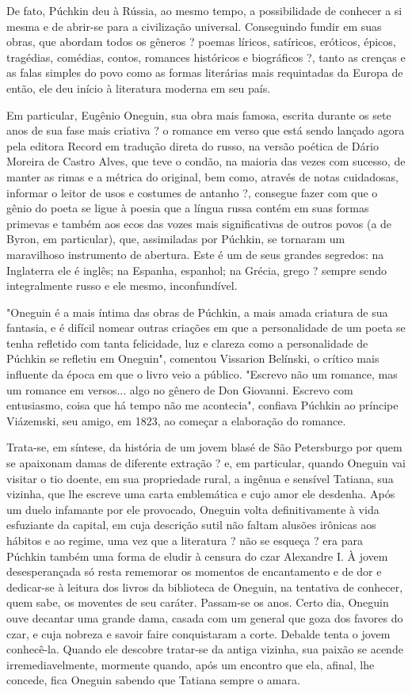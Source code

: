 De fato, Púchkin deu à Rússia, ao mesmo tempo, a possibilidade de
conhecer a si mesma e de abrir-se para a civilização universal.
Conseguindo fundir em suas obras, que abordam todos os gêneros ? poemas
líricos, satíricos, eróticos, épicos, tragédias, comédias, contos,
romances históricos e biográficos ?, tanto as crenças e as falas simples
do povo como as formas literárias mais requintadas da Europa de então,
ele deu início à literatura moderna em seu país.

Em particular, Eugênio Oneguin, sua obra mais famosa, escrita durante os
sete anos de sua fase mais criativa ? o romance em verso que está sendo
lançado agora pela editora Record em tradução direta do russo, na versão
poética de Dário Moreira de Castro Alves, que teve o condão, na maioria
das vezes com sucesso, de manter as rimas e a métrica do original, bem
como, através de notas cuidadosas, informar o leitor de usos e costumes
de antanho ?, consegue fazer com que o gênio do poeta se ligue à poesia
que a língua russa contém em suas formas primevas e também aos ecos das
vozes mais significativas de outros povos (a de Byron, em particular),
que, assimiladas por Púchkin, se tornaram um maravilhoso instrumento de
abertura. Este é um de seus grandes segredos: na Inglaterra ele é
inglês; na Espanha, espanhol; na Grécia, grego ? sempre sendo
integralmente russo e ele mesmo, inconfundível.

"Oneguin é a mais íntima das obras de Púchkin, a mais amada criatura de
sua fantasia, e é difícil nomear outras criações em que a personalidade
de um poeta se tenha refletido com tanta felicidade, luz e clareza como
a personalidade de Púchkin se refletiu em Oneguin", comentou Vissarion
Belínski, o crítico mais influente da época em que o livro veio a
público. "Escrevo não um romance, mas um romance em versos... algo no
gênero de Don Giovanni. Escrevo com entusiasmo, coisa que há tempo não
me acontecia", confiava Púchkin ao príncipe Viázemski, seu amigo, em
1823, ao começar a elaboração do romance.

Trata-se, em síntese, da história de um jovem blasé de São Petersburgo
por quem se apaixonam damas de diferente extração ? e, em particular,
quando Oneguin vai visitar o tio doente, em sua propriedade rural, a
ingênua e sensível Tatiana, sua vizinha, que lhe escreve uma carta
emblemática e cujo amor ele desdenha. Após um duelo infamante por ele
provocado, Oneguin volta definitivamente à vida esfuziante da capital,
em cuja descrição sutil não faltam alusões irônicas aos hábitos e ao
regime, uma vez que a literatura ? não se esqueça ? era para Púchkin
também uma forma de eludir à censura do czar Alexandre I. À jovem
desesperançada só resta rememorar os momentos de encantamento e de dor e
dedicar-se à leitura dos livros da biblioteca de Oneguin, na tentativa
de conhecer, quem sabe, os moventes de seu caráter. Passam-se os anos.
Certo dia, Oneguin ouve decantar uma grande dama, casada com um general
que goza dos favores do czar, e cuja nobreza e savoir faire conquistaram
a corte. Debalde tenta o jovem conhecê-la. Quando ele descobre tratar-se
da antiga vizinha, sua paixão se acende irremediavelmente, mormente
quando, após um encontro que ela, afinal, lhe concede, fica Oneguin
sabendo que Tatiana sempre o amara.

